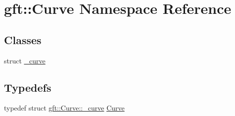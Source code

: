 \hypertarget{namespacegft_1_1Curve}{\section{gft\-:\-:Curve Namespace Reference}
\label{namespacegft_1_1Curve}
}
\subsection*{Classes}
\begin{DoxyCompactItemize}
\item 
struct \hyperlink{structgft_1_1Curve_1_1__curve}{\-\_\-curve}
\end{DoxyCompactItemize}
\subsection*{Typedefs}
\begin{DoxyCompactItemize}
\item 
typedef struct \hyperlink{structgft_1_1Curve_1_1__curve}{gft\-::\-Curve\-::\-\_\-curve} \hyperlink{namespacegft_1_1Curve_acc891f63f04c17f7b2cafe7ed9ecffdb}{Curve}
\end{DoxyCompactItemize}
